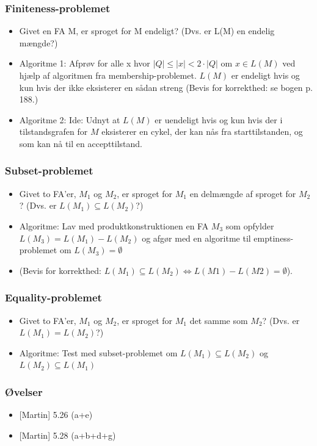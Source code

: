 \begin{frame}
  \frametitle{Finiteness-problemet}
  \begin{itemize}[<+->]
  \item Givet en FA M, er sproget for M endeligt?  
    (Dvs. er L(M) en endelig mængde?) 
  \item
    Algoritme 1: 
    Afprøv for alle x hvor $|Q| \leq |x| < 2\cdot |Q|$ om $x\in L(M)$ ved  
    hjælp af algoritmen fra membership-problemet.
    $L(M)$ er endeligt hvis og kun hvis der ikke eksisterer en  
    sådan streng 
    (Bevis for korrekthed: se bogen p. 188.)
  \item 
    Algoritme 2: Ide: Udnyt at $L(M)$ er uendeligt hvis og kun hvis der i
    tilstandsgrafen for $M$ eksisterer en cykel, der kan nås fra
    starttilstanden, og som kan nå til en accepttilstand.
  \end{itemize}
\end{frame}

\begin{frame}
\frametitle{Subset-problemet}
\begin{itemize}[<+->]
\item Givet to FA’er, $M_1$ og $M_2$, er sproget for $M_1$ en delmængde  
af sproget for $M_2$? (Dvs. er $L(M_1)\subseteq L(M_2)$?) 
\item Algoritme: 
Lav med produktkonstruktionen en FA $M_3$ som opfylder  
$L(M_3) = L(M_1) - L(M_2)$ og afgør med en algoritme til  
emptiness-problemet om $L(M_3)=\emptyset$ 
\item (Bevis for korrekthed:  $L(M_1)\subseteq L(M_2)  \Leftrightarrow  L(M1) - L(M2) = \emptyset$).
\end{itemize}
\end{frame}

\begin{frame}
\frametitle{Equality-problemet}
\begin{itemize}[<+->]
\item Givet to FA’er, $M_1$ og $M_2$, er sproget for $M_1$ det samme som $M_2$? (Dvs. er $L(M_1)=L(M_2)$?) 
\item Algoritme:
  Test med subset-problemet om $L(M_1) \subseteq L(M_2)$ og $L(M_2) \subseteq L(M_1)$
\end{itemize}
\end{frame}

\begin{frame}
\frametitle{Øvelser}
\begin{itemize}[<+->]
\item{}  [Martin] 5.26 (a+e) 
\item{}  [Martin] 5.28 (a+b+d+g)
\end{itemize}
\end{frame}

